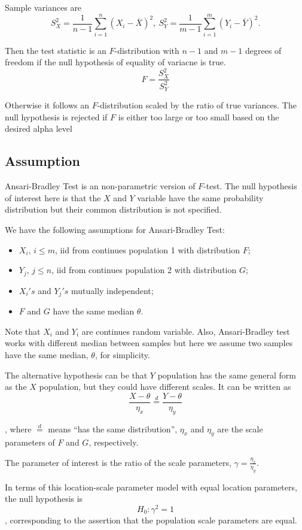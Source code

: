 Sample variances are
\[S_X^2 = \frac{1}{n-1} \sum_{i=1}^{n}(X_i - \bar{X})^2, ~S_Y^2 = \frac{1}{m-1} \sum_{i=1}^{m}(Y_i - \bar{Y})^2.\]

Then the test statistic is an $F$-distribution with $n-1$ and $m-1$ degrees of freedom if the null hypothesis of equality of variacne is true.
\[F = \frac{S_X^2}{S_Y^2}\]

Otherwise it follows an $F$-distribution scaled by the ratio of true variances. The null hypothesis is rejected if $F$ is either too large or too small based on the desired alpha level 


\subsection{Assumption}
Ansari-Bradley Test is an non-parametric version of $F$-test. The null hypothesis of interest here is that the $X$ and $Y$ variable have the same probability distribution but their common distribution is not specified. 

We have the following assumptions for Ansari-Bradley Test:
\begin{itemize}
	\item $X_i$, $i \le m$, iid from continues population 1 with distribution $F$;
	\item $Y_j$, $j \le n$, iid from continues population 2 with distribution $G$;
	\item $X_i's$ and $Y_j's$ mutually independent;
	\item $F$ and $G$  have the same median $\theta$.
\end{itemize}
Note that $X_i$ and $Y_i$ are continues random variable. Also, Ansari-Bradley test works with different median between samples but here we assume two samples have the same median, $\theta$, for simplicity.

The alternative hypothesis can be that $Y$ population has the same general form as the $X$ population, but they could have different scales. It can be written as 
\[\frac{X - \theta}{\eta_x} \stackrel{d}{=} \frac{Y - \theta}{\eta_y}\]

, where $\stackrel{d}{=}$ means ``has the same distribution'', $\eta_x$ and $\eta_y$ are the scale parameters of $F$ and $G$, respectively.

The parameter of interest is the ratio of the scale parameters, $\gamma = \frac{\eta_x}{\eta_y}$.

In terms of this location-scale parameter model with equal location parameters, the null hypothesis is 
\[H_0: \gamma^2 = 1\]
, corresponding to the assertion that the population scale parameters are equal.

